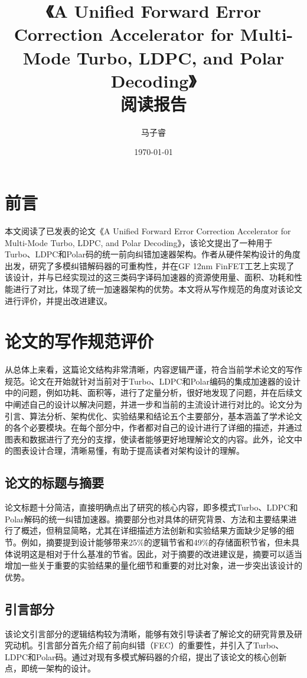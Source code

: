 \documentclass[12pt]{article}
\title{《A Unified Forward Error Correction Accelerator for Multi-Mode Turbo, LDPC, and Polar Decoding》\\ 阅读报告}
\author{马子睿}
\date{\today}
\begin{document}
\maketitle

\section{前言}
本文阅读了已发表的论文《A Unified Forward Error Correction Accelerator for Multi-Mode Turbo, LDPC, and Polar Decoding》，该论文提出了一种用于Turbo、LDPC和Polar码的统一前向纠错加速器架构。作者从硬件架构设计的角度出发，研究了多模纠错解码器的可重构性，并在GF 12nm FinFET工艺上实现了该设计，并与已经实现过的这三类码字译码加速器的资源使用量、面积、功耗和性能进行了对比，体现了统一加速器架构的优势。本文将从写作规范的角度对该论文进行评价，并提出改进建议。

\section{论文的写作规范评价}
从总体上来看，这篇论文结构非常清晰，内容逻辑严谨，符合当前学术论文的写作规范。论文在开始就针对当前对于Turbo、LDPC和Polar编码的集成加速器的设计中的问题，例如功耗、面积等，进行了定量分析，很好地发现了问题，并在后续文中阐述自己的设计以解决问题，并进一步和当前的主流设计进行对比的。论文分为引言、算法分析、架构优化、实验结果和结论五个主要部分，基本涵盖了学术论文的各个必要模块。在每个部分中，作者都对自己的设计进行了详细的描述，并通过图表和数据进行了充分的支撑，使读者能够更好地理解论文的内容。此外，论文中的图表设计合理，清晰易懂，有助于提高读者对架构设计的理解。

\subsection{论文的标题与摘要}
论文标题十分简洁，直接明确点出了研究的核心内容，即多模式Turbo、LDPC和Polar解码的统一纠错加速器。摘要部分也对具体的研究背景、方法和主要结果进行了概述，但稍显简略，尤其在详细描述方法创新和实验结果方面缺少足够的细节。例如，摘要提到设计能够带来25\%的逻辑节省和49\%的存储面积节省，但未具体说明这是相对于什么基准的节省。因此，对于摘要的改进建议是，摘要可以适当增加一些关于重要的实验结果的量化细节和重要的对比对象，进一步突出该设计的优势。

\subsection{引言部分}
该论文引言部分的逻辑结构较为清晰，能够有效引导读者了解论文的研究背景及研究动机。引言部分首先介绍了前向纠错（FEC）的重要性，并引入了Turbo、LDPC和Polar码。通过对现有多模式解码器的介绍，提出了该论文的核心创新点，即统一架构的设计。
\end{document}
